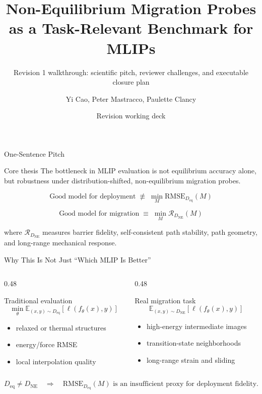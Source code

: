 \documentclass[aspectratio=169,10pt]{beamer}
\title[Non-Equilibrium Probes for MLIPs]{Non-Equilibrium Migration Probes as a Task-Relevant Benchmark for MLIPs}
\subtitle{Revision 1 walkthrough: scientific pitch, reviewer challenges, and executable closure plan}
\author{Yi Cao, Peter Mastracco, Paulette Clancy}
\institute{Johns Hopkins University}
\date{Revision working deck}
\newcommand{\Deq}{D_{\mathrm{eq}}}
\newcommand{\Dne}{D_{\mathrm{NE}}}
\begin{document}
\begin{frame}
  \titlepage
\end{frame}

\begin{frame}{One-Sentence Pitch}
  \begin{block}{Core thesis}
  The bottleneck in MLIP evaluation is not equilibrium accuracy alone, but robustness under distribution-shifted, non-equilibrium migration probes.
  \end{block}

  \vspace{0.4cm}
  \[
  \text{Good model for deployment}
  \;\not\equiv\;
  \min_M \mathrm{RMSE}_{\Deq}(M)
  \]

  \[
  \text{Good model for migration}
  \;\equiv\;
  \min_M \mathcal{R}_{\Dne}(M)
  \]

  \vspace{0.25cm}
  where $\mathcal{R}_{\Dne}$ measures barrier fidelity, self-consistent path stability,
  path geometry, and long-range mechanical response.
\end{frame}

\begin{frame}{Why This Is Not Just ``Which MLIP Is Better''}
  \begin{columns}[T]
    \begin{column}{0.48\textwidth}
      \begin{block}{Traditional evaluation}
      \[
      \min_\theta
      \mathbb{E}_{(x,y)\sim \Deq}
      \left[
        \ell(f_\theta(x),y)
      \right]
      \]
      \begin{itemize}
        \item relaxed or thermal structures
        \item energy/force RMSE
        \item local interpolation quality
      \end{itemize}
      \end{block}
    \end{column}
    \begin{column}{0.48\textwidth}
      \begin{block}{Real migration task}
      \[
      \mathbb{E}_{(x,y)\sim \Dne}
      \left[
        \ell(f_\theta(x),y)
      \right]
      \]
      \begin{itemize}
        \item high-energy intermediate images
        \item transition-state neighborhoods
        \item long-range strain and sliding
      \end{itemize}
      \end{block}
    \end{column}
  \end{columns}

  \vspace{0.35cm}
  \[
  \Deq \neq \Dne
  \quad\Rightarrow\quad
  \mathrm{RMSE}_{\Deq}(M) \text{ is an insufficient proxy for deployment fidelity.}
  \]
\end{frame}
\end{document}
